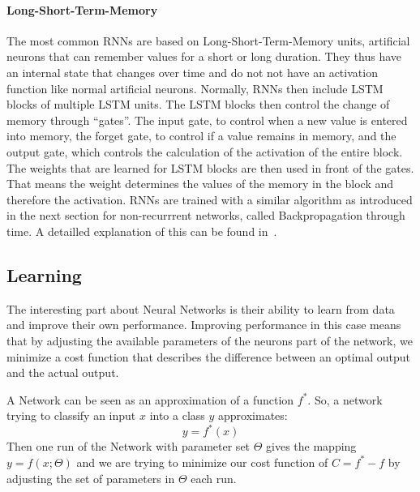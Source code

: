 \paragraph{Long-Short-Term-Memory} The most common RNNs are based on Long-Short-Term-Memory units, artificial neurons that can remember values for a short or long duration. They thus have an internal state that changes over time and do not not have an activation function like normal artificial neurons. Normally, RNNs then include LSTM blocks of multiple LSTM units. The LSTM blocks then control the change of memory through ``gates''. The input gate, to control when a new value is entered into memory, the forget gate, to control if a value remains in memory, and the output gate, which controls the calculation of the activation of the entire block. The weights that are learned for LSTM blocks are then used in front of the gates. That means the weight determines the values of the memory in the block and therefore the activation. RNNs are trained with a similar algorithm as introduced in the next section for non-recurrrent networks, called Backpropagation through time. A detailled explanation of this can be found in~\cite{58337}.


\subsection{Learning}
\label{sec:fund:Learn}
The interesting part about Neural Networks is their ability to learn from data and improve their own performance. Improving performance in this case means that by adjusting the available parameters of the neurons part of the network, we minimize a cost function that describes the difference between an optimal output and the actual output. 

A Network can be seen as an approximation of a function \(f^*\). So, a network trying to classify an input \(x\) into a class \(y\) approximates:
\begin{equation}
\label{eq:learn}
y=f^*(x)
\end{equation}
Then one run of the Network with parameter set \(\Theta\) gives the mapping \(y = f(x;\Theta)\) and we are trying to minimize our cost function of \(C= f^* - f\) by adjusting the set of parameters in \(\Theta\) each run.

